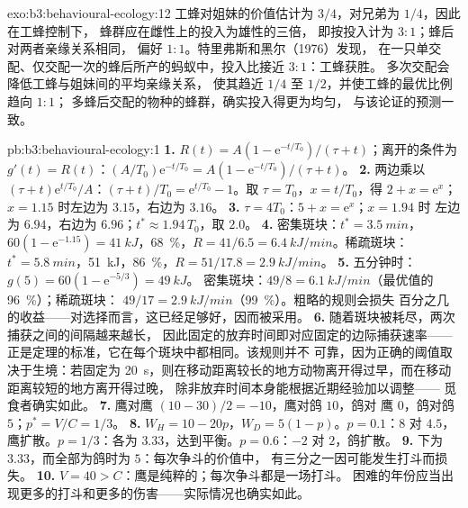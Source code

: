 \begin{solution}{exo:b3:behavioural-ecology:12}
工蜂对姐妹的价值估计为 $3/4$，对兄弟为 $1/4$，因此在工蜂控制下，
蜂群应在雌性上的投入为雄性的三倍，
即按投入计为 $3{:}1$；蜂后对两者亲缘关系相同，
偏好 $1{:}1$。特里弗斯和黑尔（1976）发现，
在一只单交配、仅交配一次的蜂后所产的蚂蚁中，投入比接近 $3{:}1$：工蜂获胜。
多次交配会降低工蜂与姐妹间的平均亲缘关系，
使其趋近 $1/4$ 至 $1/2$，并使工蜂的最优比例趋向 $1{:}1$；
多蜂后交配的物种的蜂群，确实投入得更为均匀，
与该论证的预测一致。
\end{solution}

\begin{solution}{pb:b3:behavioural-ecology:1}
\textbf{1.} $R(t) = A(1 - \mathrm{e}^{-t/T_{0}})/(\tau + t)$；离开的条件为
$g'(t) = R(t)$：$(A/T_{0})\mathrm{e}^{-t/T_{0}} = A(1 - \mathrm{e}^{-t/T_{0}})/
(\tau + t)$。
\textbf{2.} 两边乘以 $(\tau + t)\mathrm{e}^{t/T_{0}}/A$：$(\tau + t)/T_{0}
= \mathrm{e}^{t/T_{0}} - 1$。取 $\tau = T_{0}$，$x = t/T_{0}$，得 $2 + x =
\mathrm{e}^{x}$；$x = 1.15$ 时左边为 $3.15$，右边为 $3.16$。
\textbf{3.} $\tau = 4T_{0}$：$5 + x = \mathrm{e}^{x}$；$x = 1.94$ 时
左边为 $6.94$，右边为 $6.96$；$t^{*} \approx 1.94\,T_{0}$，取 $2.0$。
\textbf{4.} 密集斑块：$t^{*} = \qty{3.5}{min}$，$60(1 - \mathrm{e}^{-1.15}) =
\qty{41}{kJ}$，\qty{68}{\%}，$R = 41/6.5 = \qty{6.4}{kJ/min}$。稀疏斑块：
$t^{*} = \qty{5.8}{min}$，\qty{51}{kJ}，\qty{86}{\%}，$R = 51/17.8 =
\qty{2.9}{kJ/min}$。
\textbf{5.} 五分钟时：$g(5) = 60(1 - \mathrm{e}^{-5/3}) = \qty{49}{kJ}$。
密集斑块：$49/8 = \qty{6.1}{kJ/min}$（最优值的 \qty{96}{\%}）；稀疏斑块：
$49/17 = \qty{2.9}{kJ/min}$（\qty{99}{\%}）。粗略的规则会损失
百分之几的收益——对选择而言，这已经足够好，因而被采用。
\textbf{6.} 随着斑块被耗尽，两次捕获之间的间隔越来越长，
因此固定的放弃时间即对应固定的边际捕获速率——
正是定理的标准，它在每个斑块中都相同。该规则并不
可靠，因为正确的阈值取决于生境：若固定为
\qty{20}{s}，则在移动距离较长的地方动物离开得过早，而在移动距离较短的地方离开得过晚，
除非放弃时间本身能根据近期经验加以调整——
觅食者确实如此。
\textbf{7.} 鹰对鹰 $(10 - 30)/2 = -10$，鹰对鸽 $10$，鸽对
鹰 $0$，鸽对鸽 $5$；$p^{*} = V/C = 1/3$。
\textbf{8.} $W_{H} = 10 - 20p$，$W_{D} = 5(1 - p)$。$p = 0.1$：$8$ 对
$4.5$，鹰扩散。$p = 1/3$：各为 $3.33$，达到平衡。$p = 0.6$：$-2$
对 $2$，鸽扩散。
\textbf{9.} 下为 $3.33$，而全部为鸽时为 $5$：每次争斗的价值中，
有三分之一因可能发生打斗而损失。
\textbf{10.} $V = 40 > C$：鹰是纯粹的；每次争斗都是一场打斗。
困难的年份应当出现更多的打斗和更多的伤害——实际情况也确实如此。

\end{solution}
